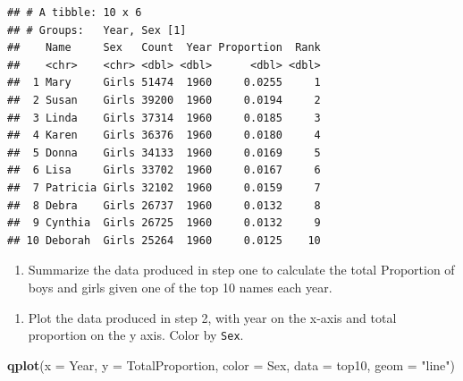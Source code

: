 \documentclass[]{book}
\newenvironment{Shaded}{\begin{snugshade}}{\end{snugshade}}
\newcommand{\KeywordTok}[1]{\textcolor[rgb]{0.13,0.29,0.53}{\textbf{#1}}}
\newcommand{\DataTypeTok}[1]{\textcolor[rgb]{0.13,0.29,0.53}{#1}}
\newcommand{\StringTok}[1]{\textcolor[rgb]{0.31,0.60,0.02}{#1}}
\newcommand{\CommentTok}[1]{\textcolor[rgb]{0.56,0.35,0.01}{\textit{#1}}}
\newcommand{\OperatorTok}[1]{\textcolor[rgb]{0.81,0.36,0.00}{\textbf{#1}}}
\newcommand{\NormalTok}[1]{#1}
\providecommand{\tightlist}{%
  \setlength{\itemsep}{0pt}\setlength{\parskip}{0pt}}
\begin{document}
\begin{verbatim}
## # A tibble: 10 x 6
## # Groups:   Year, Sex [1]
##    Name     Sex   Count  Year Proportion  Rank
##    <chr>    <chr> <dbl> <dbl>      <dbl> <dbl>
##  1 Mary     Girls 51474  1960     0.0255     1
##  2 Susan    Girls 39200  1960     0.0194     2
##  3 Linda    Girls 37314  1960     0.0185     3
##  4 Karen    Girls 36376  1960     0.0180     4
##  5 Donna    Girls 34133  1960     0.0169     5
##  6 Lisa     Girls 33702  1960     0.0167     6
##  7 Patricia Girls 32102  1960     0.0159     7
##  8 Debra    Girls 26737  1960     0.0132     8
##  9 Cynthia  Girls 26725  1960     0.0132     9
## 10 Deborah  Girls 25264  1960     0.0125    10
\end{verbatim}

\begin{enumerate}
\def\labelenumi{\arabic{enumi}.}
\setcounter{enumi}{1}
\tightlist
\item
  Summarize the data produced in step one to calculate the total
  Proportion of boys and girls given one of the top 10 names each year.
\end{enumerate}

\begin{Shaded}
\end{Shaded}

\begin{enumerate}
\def\labelenumi{\arabic{enumi}.}
\setcounter{enumi}{2}
\tightlist
\item
  Plot the data produced in step 2, with year on the x-axis and total
  proportion on the y axis. Color by \texttt{Sex}.
\end{enumerate}

\begin{Shaded}
\begin{Highlighting}[]
\KeywordTok{qplot}\NormalTok{(}\DataTypeTok{x =}\NormalTok{ Year, }
      \DataTypeTok{y =}\NormalTok{ TotalProportion, }
      \DataTypeTok{color =}\NormalTok{ Sex,}
      \DataTypeTok{data =}\NormalTok{ top10,}
      \DataTypeTok{geom =} \StringTok{"line"}\NormalTok{)}
\end{Highlighting}
\end{Shaded}
\end{document}
